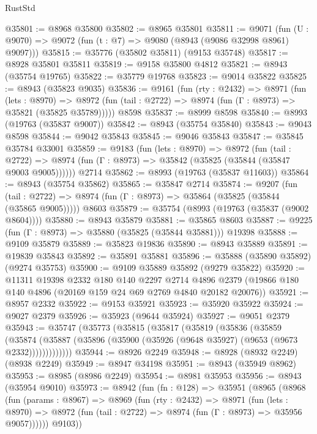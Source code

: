 \begin{lexlean}{RustStd}
\begin{coremodule}
{\begin{coremodule}
{{{{{{{{{{{{{{{{{{{{{{{{{{{{{{{{{{{{{{{@35801 := @8968 @35800
@35802 := @8965 @35801
@35811 := @9071
    (fun (U : @9070) => @9072 (fun (t : @7) => @9080 (@8943 (@9086 @32998 @8961) @9097)))
@35815 := @35776 (@35802 @35811) (@9153 @35748)
@35817 := @8928 @35801 @35811
@35819 := @9158 @35800 @4812
@35821 := @8943 (@35754 @19765)
@35822 := @35779 @19768
@35823 := @9014 @35822
@35825 := @8943 (@35823 @9035)
@35836 := @9161
    (fun (rty : @2432) =>
    @8971
      (fun (lets : @8970) =>
      @8972 (fun (tail : @2722) => @8974 (fun (Γ : @8973) => @35821 (@35825 @35789)))))
    @8598
@35837 := @8999 @8598
@35840 := @8993 (@19763 (@35837 @9007))
@35842 := @8943 (@35754 @35840)
@35843 := @9043 @8598
@35844 := @9042 @35843
@35845 := @9046 @35843
@35847 := @35845 @35784 @33001
@35859 := @9183
    (fun (lets : @8970) =>
    @8972
      (fun (tail : @2722) =>
      @8974 (fun (Γ : @8973) => @35842 (@35825 (@35844 (@35847 @9003 @9005))))))
    @2714
@35862 := @8993 (@19763 (@35837 @11603))
@35864 := @8943 (@35754 @35862)
@35865 := @35847 @2714
@35874 := @9207
    (fun (tail : @2722) => @8974 (fun (Γ : @8973) => @35864 (@35825 (@35844 (@35865 @9005)))))
    @8603
@35879 := @35754 (@8993 (@19763 (@35837 (@9002 @8604))))
@35880 := @8943 @35879
@35881 := @35865 @8603
@35887 := @9225 (fun (Γ : @8973) => @35880 (@35825 (@35844 @35881))) @19398
@35888 := @9109 @35879
@35889 := @35823 @19836
@35890 := @8943 @35889
@35891 := @19839 @35843
@35892 := @35891 @35881
@35896 := @35888 (@35890 @35892) (@9274 @35753)
@35900 := @9109 @35889 @35892 (@9279 @35822)
@35920 := @11311
    @19398
    @2332
    @180
    @140
    @2297
    @2714
    @4896
    @2379
    (@19866 @180 @140 @4896 (@20169 @159 @24 @69 @2769 @4840 @20182 @20076))
@35921 := @8957 @2332
@35922 := @9153 @35921
@35923 := @35920 @35922
@35924 := @9027 @2379
@35926 := @35923 (@9644 @35924)
@35927 := @9051 @2379
@35943 := @35747
    (@35773
      (@35815
        (@35817
          (@35819
            (@35836
              (@35859
                (@35874
                  (@35887 (@35896 (@35900 (@35926 (@9648 @35927) (@9653 (@9673 @2332)))))))))))))
@35944 := @8926 @2249
@35948 := @8928 (@8932 @2249) (@8938 @2249)
@35949 := @8947 @34198
@35951 := @8943 (@35949 @8962)
@35953 := @8985 (@8986 @2249)
@35954 := @8981 @35953
@35956 := @8943 (@35954 @9010)
@35973 := @8942
    (fun (fn : @128) =>
    @35951
      (@8965
        (@8968
          (fun (params : @8967) =>
          @8969
            (fun (rty : @2432) =>
            @8971
              (fun (lets : @8970) =>
              @8972 (fun (tail : @2722) => @8974 (fun (Γ : @8973) => @35956 @9057))))))
        @9103))
}}}}}}}}}}}}}}}}}}}}}}}}}}}}}}}}}}}}}}}
\end{coremodule}}
\end{coremodule}
\end{lexlean}
